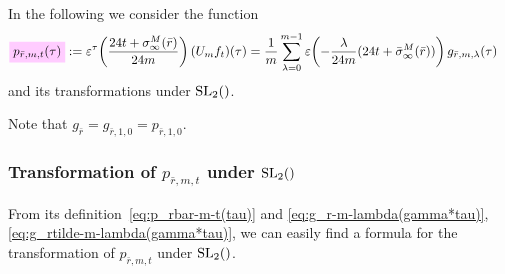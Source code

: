 \documentclass{article}
\begin{document}
In the following we consider the function
\begin{align}
  \defineNotation[p-rbar-m-t-tau]{p_{\bar{r},m,t}(\tau)}
  &:= \unityPowerTau{\frac{24t+\sigmainfty[M]{\bar{r}}}{24m} } (U_mf_t)(\tau)
  =
    \frac{1}{m} \sum_{\lambda=0}^{m-1}
    \unityPower{-\frac{\lambda}{24m} (24t+\sigmainftybar[M]{\bar{r}})}
    g_{\bar{r},m,\lambda}(\tau)
  \label{eq:p_rbar-m-t(tau)}
\end{align}
and its transformations under $\SL2Z$.

Note that $g_{\bar{r}} = g_{\bar{r},1,0}=p_{\bar{r},1,0}$.


\subsubsection{Transformation of $p_{\bar{r},m,t}$ under $\SL2Z$}

From its definition~\eqref{eq:p_rbar-m-t(tau)} and
\eqref{eq:g_r-m-lambda(gamma*tau)},
\eqref{eq:g_rtilde-m-lambda(gamma*tau)}, we can easily find a formula
for the transformation of $p_{\bar{r},m,t}$ under $\SL2Z$.
\end{document}
